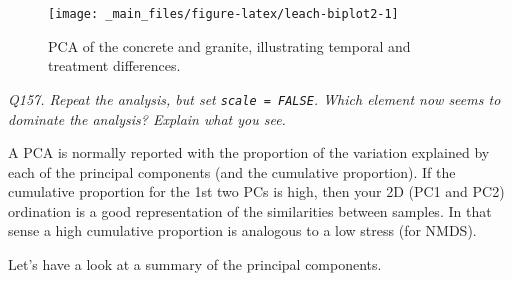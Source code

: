 \documentclass[
  11pt,
  a4paper,
]{book}
\newenvironment{Shaded}{\begin{snugshade}}{\end{snugshade}}
\newcommand{\AttributeTok}[1]{\textcolor[rgb]{0.77,0.63,0.00}{#1}}
\newcommand{\CommentTok}[1]{\textcolor[rgb]{0.56,0.35,0.01}{\textit{#1}}}
\newcommand{\ConstantTok}[1]{\textcolor[rgb]{0.00,0.00,0.00}{#1}}
\newcommand{\DecValTok}[1]{\textcolor[rgb]{0.00,0.00,0.81}{#1}}
\newcommand{\FunctionTok}[1]{\textcolor[rgb]{0.00,0.00,0.00}{#1}}
\newcommand{\NormalTok}[1]{#1}
\newcommand{\OtherTok}[1]{\textcolor[rgb]{0.56,0.35,0.01}{#1}}
\newcommand{\SpecialCharTok}[1]{\textcolor[rgb]{0.00,0.00,0.00}{#1}}
\newcommand{\StringTok}[1]{\textcolor[rgb]{0.31,0.60,0.02}{#1}}
\begin{document}
\begin{Shaded}
\end{Shaded}

\begin{figure}

{\centering \texttt{[image: \_main\_files/figure-latex/leach-biplot2-1]} 

}

\caption{PCA of the concrete and granite, illustrating temporal and treatment differences.}\label{fig:leach-biplot2}
\end{figure}

\emph{Q157. Repeat the analysis, but set \texttt{scale\ =\ FALSE}. Which element now seems to dominate the analysis? Explain what you see.}

A PCA is normally reported with the proportion of the variation explained by each of the principal components (and the cumulative proportion). If the cumulative proportion for the 1st two PCs is high, then your 2D (PC1 and PC2) ordination is a good representation of the similarities between samples. In that sense a high cumulative proportion is analogous to a low stress (for NMDS).

Let's have a look at a summary of the principal components.

\begin{Shaded}
\end{Shaded}
\end{document}
